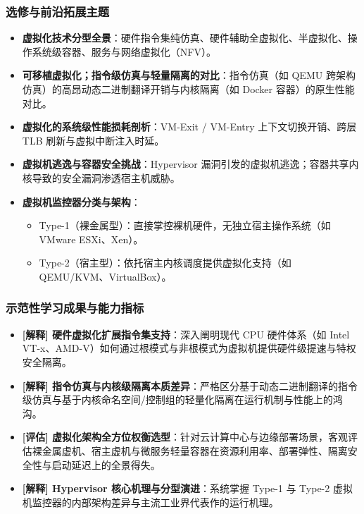 \subsubsection{选修与前沿拓展主题}
\begin{itemize}\setlength{\itemsep}{0pt}\setlength{\parskip}{0pt}
    \item \textbf{虚拟化技术分型全景}：硬件指令集纯仿真、硬件辅助全虚拟化、半虚拟化、操作系统级容器、服务与网络虚拟化（NFV）。
    \item \textbf{可移植虚拟化；指令级仿真与轻量隔离的对比}：指令仿真（如 QEMU 跨架构仿真）的高昂动态二进制翻译开销与内核隔离（如 Docker 容器）的原生性能对比。
    \item \textbf{虚拟化的系统级性能损耗剖析}：VM-Exit / VM-Entry 上下文切换开销、跨层 TLB 刷新与虚拟中断注入时延。
    \item \textbf{虚拟机逃逸与容器安全挑战}：Hypervisor 漏洞引发的虚拟机逃逸；容器共享内核导致的安全漏洞渗透宿主机威胁。
    \item \textbf{虚拟机监控器分类与架构}：
    \begin{itemize}\setlength{\itemsep}{0pt}\setlength{\parskip}{0pt}
        \item Type-1（裸金属型）：直接掌控裸机硬件，无独立宿主操作系统（如 VMware ESXi、Xen）。
        \item Type-2（宿主型）：依托宿主内核调度提供虚拟化支持（如 QEMU/KVM、VirtualBox）。
    \end{itemize}
\end{itemize}

\subsubsection{示范性学习成果与能力指标}
\begin{itemize}\setlength{\itemsep}{0pt}\setlength{\parskip}{0pt}
    \item \textbf{[解释] 硬件虚拟化扩展指令集支持}：深入阐明现代 CPU 硬件体系（如 Intel VT-x、AMD-V）如何通过根模式与非根模式为虚拟机提供硬件级提速与特权安全隔离。
    \item \textbf{[解释] 指令仿真与内核级隔离本质差异}：严格区分基于动态二进制翻译的指令级仿真与基于内核命名空间/控制组的轻量化隔离在运行机制与性能上的鸿沟。
    \item \textbf{[评估] 虚拟化架构全方位权衡选型}：针对云计算中心与边缘部署场景，客观评估裸金属虚机、宿主虚机与微服务轻量容器在资源利用率、部署弹性、隔离安全性与启动延迟上的全景得失。
    \item \textbf{[解释] Hypervisor 核心机理与分型演进}：系统掌握 Type-1 与 Type-2 虚拟机监控器的内部架构差异与主流工业界代表作的运行机理。
\end{itemize}

